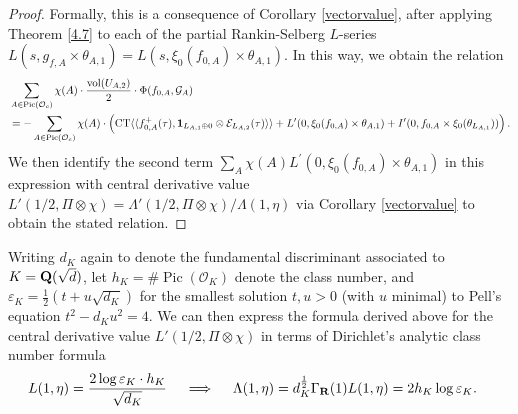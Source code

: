 \documentclass{amsart}
\theoremstyle{definition}
\begin{document}
\begin{proof} 

Formally, this is a consequence of Corollary \ref{vectorvalue}, after applying Theorem \ref{4.7} to each of the partial Rankin-Selberg $L$-series 
$L(s, g_{f, A} \times \theta_{A,1}) = L(s, \xi_0(f_{0, A}) \times \theta_{A, 1})$. In this way, we obtain the relation
\begin{equation*}\begin{aligned} 
&\sum\limits_{A \in \operatorname{Pic}(\mathcal{O}_c)} \chi(A) \cdot \frac{\operatorname{vol}(U_{A, 2})}{2} \cdot \Phi( f_{0, A}, \mathcal{G}_A) \\
&= -\sum\limits_{A \in \operatorname{Pic}(\mathcal{O}_c)} \chi(A)  \cdot \left( 
\operatorname{CT}  \langle \langle f_{0, A}^+(\tau),  {\bf{1}}_{L_{A,1} \oplus 0} \otimes \mathcal{E}_{L_{A,2}}(\tau) \rangle \rangle 
+ L'(0, \xi_0(f_{0, A}) \times \theta_{A, 1}) + I'(0, f_{0, A} \times \xi_0(\theta_{L_{A,1}})) \right). \end{aligned}\end{equation*}
We then identify the second term $\sum_A \chi(A) L^{\prime}(0, \xi_0(f_{0,A}) \times \theta_{A,1})$ in this expression with central derivative value 
$L'(1/2, \Pi \otimes \chi) = \Lambda'(1/2, \Pi \otimes \chi)/\Lambda(1, \eta)$ via Corollary \ref{vectorvalue} to obtain the stated relation. \end{proof}

Writing $d_K$ again to denote the fundamental discriminant associated to $K = {\bf{Q}}(\sqrt{d})$, let $h_K = \# \operatorname{Pic}(\mathcal{O}_K)$ denote the class number, 
and $\varepsilon_K = \frac{1}{2}(t + u \sqrt{d_K})$ for the smallest solution $t, u >0$ (with $u$ minimal) to Pell's equation $t^2 - d_K u^2 = 4$.
We can then express the formula derived above for the central derivative value $L'(1/2, \Pi \otimes \chi)$ in terms of Dirichlet's analytic class number formula
\begin{align}\label{Dirichlet} L(1, \eta) &= \frac{2 \log \varepsilon_K \cdot h_K}{\sqrt{d_K}} \quad \implies \quad 
\Lambda(1, \eta) = d_K^{\frac{1}{2}} \Gamma_{\bf{R}}(1) L(1, \eta) = 2 h_K \log \varepsilon_K. \end{align}
\end{document}
